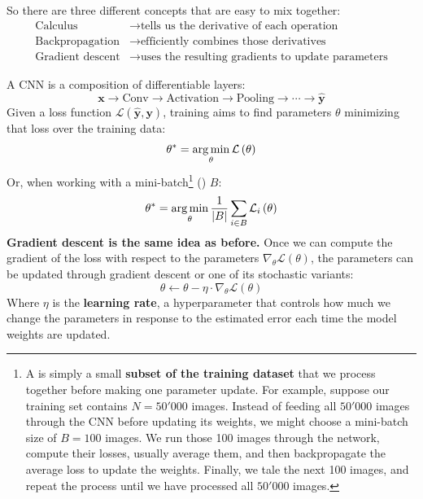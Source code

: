\begin{remarkbox}
    \highspace
    So there are three different concepts that are easy to mix together:
    \begin{align*}
        \text{Calculus}         &\rightarrow \text{tells us the derivative of each operation} \\
        \text{Backpropagation}  &\rightarrow \text{efficiently combines those derivatives} \\
        \text{Gradient descent} &\rightarrow \text{uses the resulting gradients to update parameters}
    \end{align*}
\end{remarkbox}

\highspace
A CNN is a composition of differentiable layers:
\begin{equation*}
    \mathbf{x} \to \text{Conv} \to \text{Activation} \to \text{Pooling} \to \cdots \to \hat{\mathbf{y}}
\end{equation*}
Given a loss function $\mathcal{L}\left(\hat{\mathbf{y}}, \mathbf{y}\right)$, training aims to find parameters $\theta$ minimizing that loss over the training data:
\begin{equation*}
    \theta^{*} = \operatorname*{arg\,min}_{\theta} \mathcal{L}\left(\theta\right)
\end{equation*}
Or, when working with a mini-batch\footnote{%
    A  is simply a small \textbf{subset of the training dataset} that we process together before making one parameter update. For example, suppose our training set contains $N = 50'000$ images. Instead of feeding all $50'000$ images through the CNN before updating its weights, we might choose a mini-batch size of $B = 100$ images. We run those 100 images through the network, compute their losses, usually average them, and then backpropagate the average loss to update the weights. Finally, we tale the next 100 images, and repeat the process until we have processed all $50'000$ images.
} () $B$:
\begin{equation*}
    \theta^{*} = \operatorname*{arg\,min}_{\theta} \frac{1}{\left|B\right|} \sum_{i \in B} \mathcal{L}_{i}\left(\theta\right)
\end{equation*}
\textcolor{Green3}{ \textbf{Gradient descent is the same idea as before.}} Once we can compute the gradient of the loss with respect to the parameters $\nabla_{\theta} \mathcal{L}\left(\theta\right)$, the parameters can be updated through gradient descent or one of its stochastic variants:
\begin{equation*}
    \theta \leftarrow \theta - \eta \cdot \nabla_{\theta} \mathcal{L}\left(\theta\right)
\end{equation*}
Where $\eta$ is the \textbf{learning rate}, a hyperparameter that controls how much we change the parameters in response to the estimated error each time the model weights are updated.


